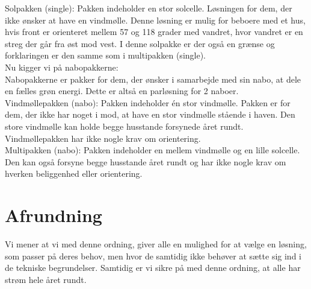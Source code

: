\documentclass[12pt,a4paper]{article}
\theoremstyle{break}
\theoremstyle{nonumberplain}
\begin{document}
Solpakken (single): Pakken indeholder en stor solcelle. Løsningen for dem, der ikke ønsker at have en vindmølle. Denne løsning er mulig for beboere med et hus, hvis front er orienteret mellem 57 og 118 grader med vandret, hvor vandret er en streg der går fra øst mod vest. I denne solpakke er der også en grænse og forklaringen er den samme som i multipakken (single). 
\\

Nu kigger vi på nabopakkerne:
\\

Nabopakkerne er pakker for dem, der ønsker i samarbejde med sin nabo, at dele en fælles grøn energi. Dette er altså en parløsning for 2 naboer.
\\

Vindmøllepakken (nabo): Pakken indeholder én stor vindmølle. Pakken er for dem, der ikke har noget i mod, at have en stor vindmølle stående i haven. Den store vindmølle kan holde begge husstande forsynede året rundt. Vindmøllepakken har ikke nogle krav om orientering.
\\

Multipakken (nabo): Pakken indeholder en mellem vindmølle og en lille solcelle. Den kan også forsyne begge husstande året rundt og har ikke nogle krav om hverken beliggenhed eller orientering. 
\\



\section{Afrundning}
Vi mener at vi med denne ordning, giver alle en mulighed for at vælge en løsning, som passer på deres behov, men hvor de samtidig ikke behøver at sætte sig ind i de tekniske begrundelser. 
Samtidig er vi sikre på med denne ordning, at alle har strøm hele året rundt. 
\end{document}
